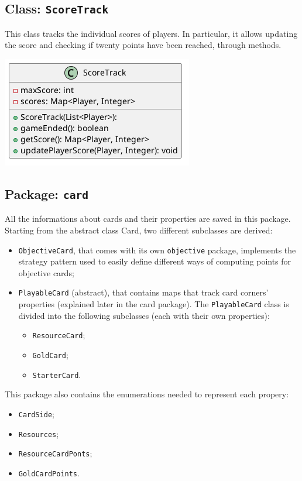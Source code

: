 \documentclass{article}
\begin{document}
\newpage
\subsection{Class: \texttt{ScoreTrack}}
This class tracks the individual scores of players.
In particular, it allows updating the score and checking if twenty points have been reached, through methods.

\begin{center}
    \includegraphics[scale=0.5]{ScoreTrack.png}
\end{center}
\newpage
\subsection{Package: \texttt{card}}
All the informations about cards and their properties are saved in this package.
Starting from the abstract class Card, two different subclasses are derived:
\begin{itemize}
    \item \texttt{ObjectiveCard}, that comes with its own \texttt{objective} package, implements the strategy pattern used to easily define different ways of computing points for objective cards;
    \item \texttt{PlayableCard} (abstract), that contains maps that track card corners' properties (explained later in the card package). 
    The \texttt{PlayableCard} class is divided into the following subclasses (each with their own properties):
    \begin{itemize}
        \item \texttt{ResourceCard};
        \item \texttt{GoldCard};
        \item \texttt{StarterCard}.
    \end{itemize}
\end{itemize}
This package also contains the enumerations needed to represent each propery:
\begin{itemize}
    \item \texttt{CardSide};
    \item \texttt{Resources};
    \item \texttt{ResourceCardPonts};
    \item \texttt{GoldCardPoints}.
\end{itemize}
\end{document}
